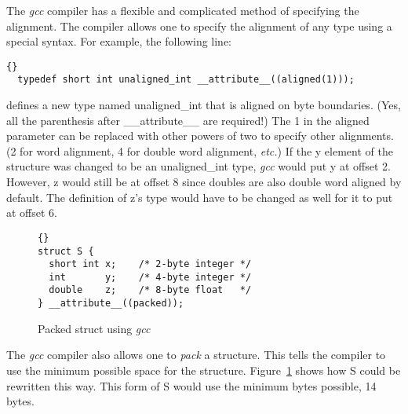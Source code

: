
The \emph{gcc} compiler has a flexible and complicated method of
specifying the alignment. The compiler allows one to specify the
alignment of any type using a special syntax. For example, the
following line:
\begin{lstlisting}[stepnumber=0]{}
  typedef short int unaligned_int __attribute__((aligned(1)));
\end{lstlisting}
\noindent defines a new type named {\code unaligned\_int} that
is aligned on byte boundaries. (Yes, all the parenthesis after {\code
\_\_attribute\_\_} are required!)  The 1 in the {\code aligned}
parameter can be replaced with other powers of two to specify other
alignments. (2 for word alignment, 4 for double word alignment,
\emph{etc.}) If the {\code y} element of the structure was changed to be an
{\code unaligned\_int} type, \emph{gcc} would put {\code y} at offset 2.
However, {\code z} would still be at offset 8 since doubles are also double
word aligned by default. The definition of {\code z}'s type would have
to be changed as well for it to put at offset 6.

\begin{figure}[t]
\begin{lstlisting}[frame=tlrb,stepnumber=0]{}
struct S {
  short int x;    /* 2-byte integer */
  int       y;    /* 4-byte integer */
  double    z;    /* 8-byte float   */
} __attribute__((packed));
\end{lstlisting}
\caption{Packed struct using \emph{gcc} \label{fig:packedStruct}}
\end{figure}

The \emph{gcc} compiler also allows one to \emph{pack} a structure. This
tells the compiler to use the minimum possible space for the structure.
Figure~\ref{fig:packedStruct} shows how {\code S} could be rewritten this way.
This form of {\code S} would use the minimum bytes possible, 14 bytes.

